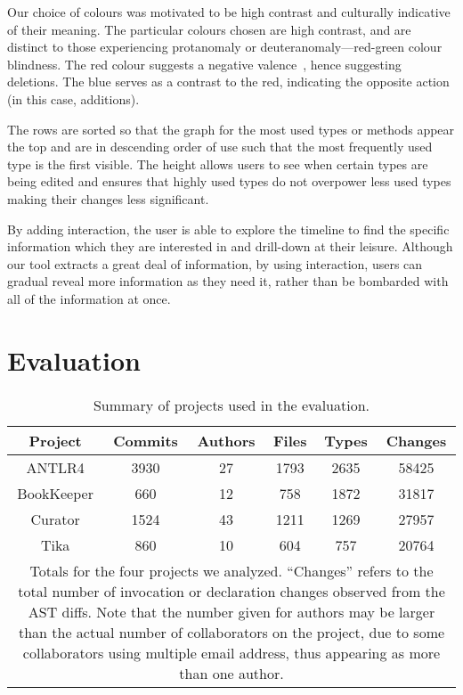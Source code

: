 Our choice of colours was motivated to be high contrast and culturally indicative of their meaning. The particular colours chosen are high contrast, and are distinct to those experiencing protanomaly or deuteranomaly---red-green colour blindness. The red colour suggests a negative valence~\cite{moller2009}, hence suggesting deletions. The blue serves as a contrast to the red, indicating the opposite action (in this case, additions).

The rows are sorted so that the graph for the most used types or methods appear the top and are in descending order of use such that the most frequently used type is the first visible. The height allows users to see when certain types are being edited and ensures that highly used types do not overpower less used types making their changes less significant.

By adding interaction, the user is able to explore the timeline to find the specific information which they are interested in and drill-down at their leisure. Although our tool extracts a great deal of information, by using interaction, users can gradual reveal more information as they need it, rather than be bombarded with all of the information at once.

\section{Evaluation}


\begin{table}[t]
\renewcommand{\arraystretch}{1.3}
\centering
\caption{Summary of projects used in the evaluation.}
\label{tab:project-summary}
\begin{tabular}{c|ccccc}
\hline
\bfseries Project & \bfseries Commits & \bfseries Authors & \bfseries Files &   \bfseries Types &  \bfseries  Changes\\
\hline
ANTLR4 & 3930 & 27 & 1793 & 2635 & 58425\\
BookKeeper & 660 & 12 & 758 & 1872 & 31817\\
Curator & 1524 & 43 & 1211 & 1269 & 27957\\
Tika & 860 & 10 & 604 & 757 & 20764\\
\hline
\multicolumn{6}{p{3.25in}}{\footnotesize Totals for the four projects we analyzed. ``Changes'' refers to the total number of invocation or declaration changes observed from the AST diffs. Note that the number given for authors may be larger than the actual number of collaborators on the project, due to some collaborators using multiple email address, thus appearing as more than one author.}
\end{tabular}
\end{table}

